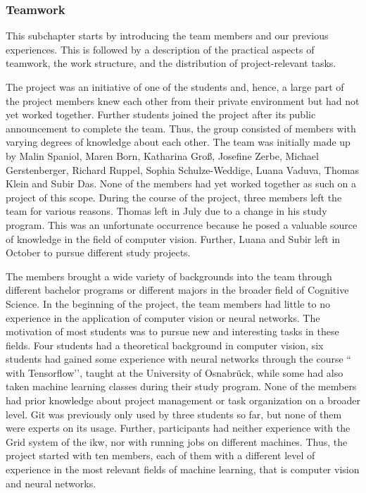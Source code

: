 \subsubsection{Teamwork}
\label{subsec:Teamwork}

This subchapter starts by introducing the team members and our previous experiences. This is followed by a description of the practical aspects of teamwork, the work structure, and the distribution of project-relevant tasks.

\bigskip
The project was an initiative of one of the students and, hence, a large part of the project members knew each other from their private environment but had not yet worked together. Further students joined the project after its public announcement to complete the team. Thus, the group consisted of members with varying degrees of knowledge about each other. The team was initially made up by Malin Spaniol, Maren Born, Katharina Groß, Josefine Zerbe, Michael Gerstenberger, Richard Ruppel, Sophia Schulze-Weddige, Luana Vaduva, Thomas Klein and Subir Das. None of the members had yet worked together as such on a project of this scope. During the course of the project, three members left the team for various reasons. Thomas left in July due to a change in his study program. This was an unfortunate occurrence because he posed a valuable source of knowledge in the field of computer vision. Further, Luana and Subir left in October to pursue different study projects.

\bigskip
The members brought a wide variety of backgrounds into the team through different bachelor programs or different majors in the broader field of Cognitive Science. In the beginning of the project, the team members had little to no experience in the application of computer vision or neural networks. The motivation of most students was to pursue new and interesting tasks in these fields. Four students had a theoretical background in computer vision, six students had gained some experience with neural networks through the course `` with Tensorflow’’, taught at the University of Osnabr{\"u}ck, while some had also taken machine learning classes during their study program. None of the members had prior knowledge about project management or task organization on a broader level. Git was previously only used by three students so far, but none of them were experts on its usage. Further, participants had neither experience with the Grid system of the \acrshort{ikw}, nor with running jobs on different machines. Thus, the project started with ten members, each of them with a different level of experience in the most relevant fields of machine learning, that is computer vision and neural networks.

